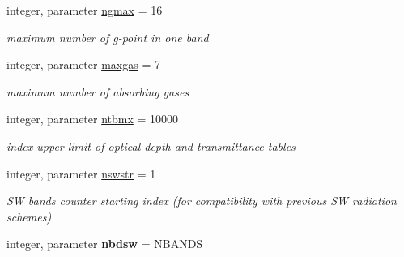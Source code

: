 \begin{DoxyCompactItemize}
integer, parameter \hyperlink{namespacemodule__radsw__parameters_a0ba0ff5c18d3303a852d88687b4b5ca9}{ngmax} = 16
\begin{DoxyCompactList}\small\item\em maximum number of g-\/point in one band \end{DoxyCompactList}\item 
\mbox{\label{namespacemodule__radsw__parameters_a5bc6fbb4231281a604352eec6b8e2bfc}} 
integer, parameter \hyperlink{namespacemodule__radsw__parameters_a5bc6fbb4231281a604352eec6b8e2bfc}{maxgas} = 7
\begin{DoxyCompactList}\small\item\em maximum number of absorbing gases \end{DoxyCompactList}\item 
\mbox{\label{namespacemodule__radsw__parameters_a4bd72558be40bfccfb78c48e640acd07}} 
integer, parameter \hyperlink{namespacemodule__radsw__parameters_a4bd72558be40bfccfb78c48e640acd07}{ntbmx} = 10000
\begin{DoxyCompactList}\small\item\em index upper limit of optical depth and transmittance tables \end{DoxyCompactList}\item 
\mbox{\label{namespacemodule__radsw__parameters_a3d4238ce9a40d70a6cdfe241d640ff5f}} 
integer, parameter \hyperlink{namespacemodule__radsw__parameters_a3d4238ce9a40d70a6cdfe241d640ff5f}{nswstr} = 1
\begin{DoxyCompactList}\small\item\em SW bands counter starting index (for compatibility with previous SW radiation schemes) \end{DoxyCompactList}\item 
\mbox{\label{namespacemodule__radsw__parameters_ab1e121fde29dde00871e4a7d43be1ddb}} 
integer, parameter {\bfseries nbdsw} = N\+B\+A\+N\+DS
\end{DoxyCompactItemize}

